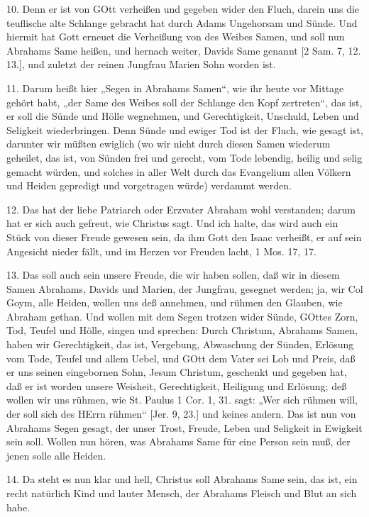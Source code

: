 10. Denn er ist von GOtt verheißen und gegeben wider den Fluch, darein uns die teuflische alte Schlange gebracht hat durch Adams Ungehorsam und Sünde. Und hiermit hat Gott erneuet die Verheißung von des Weibes Samen, und soll nun Abrahams Same heißen, und hernach weiter, Davids Same genannt [2 Sam. 7, 12. 13.], und zuletzt der reinen Jungfrau Marien Sohn worden ist.

11. Darum heißt hier „Segen in Abrahams Samen“, wie ihr heute vor Mittage gehört habt, „der Same des Weibes soll der Schlange den Kopf zertreten“, das ist, er soll die Sünde und Hölle wegnehmen, und Gerechtigkeit, Unschuld, Leben und Seligkeit wiederbringen. Denn Sünde und ewiger Tod ist der Fluch, wie gesagt ist, darunter wir müßten ewiglich (wo wir nicht durch diesen Samen wiederum geheilet, das ist, von Sünden frei und gerecht, vom Tode lebendig, heilig und selig gemacht würden, und solches in aller Welt durch das Evangelium allen Völkern und Heiden gepredigt und vorgetragen würde) verdammt werden.

12. Das hat der liebe Patriarch oder Erzvater Abraham wohl verstanden; darum hat er sich auch gefreut, wie Christus sagt. Und ich halte, das wird auch ein Stück von dieser Freude gewesen sein, da ihm Gott den Isaac verheißt, er auf sein Angesicht nieder fällt, und im Herzen vor Freuden lacht, 1 Mos. 17, 17.

13. Das soll auch sein unsere Freude, die wir haben sollen, daß wir in diesem Samen Abrahams, Davids und Marien, der Jungfrau, gesegnet werden; ja, wir Col Goym, alle Heiden, wollen uns deß annehmen, und rühmen den Glauben, wie Abraham gethan. Und wollen mit dem Segen trotzen wider Sünde, GOttes Zorn, Tod, Teufel und Hölle, singen und sprechen: Durch Christum, Abrahams Samen, haben wir Gerechtigkeit, das ist, Vergebung, Abwaschung der Sünden, Erlösung vom Tode, Teufel und allem Uebel, und GOtt dem Vater sei Lob und Preis, daß er uns seinen eingebornen Sohn, Jesum Christum, geschenkt und gegeben hat, daß er ist worden unsere Weisheit, Gerechtigkeit, Heiligung und Erlösung; deß wollen wir uns rühmen, wie St. Paulus 1 Cor. 1, 31. sagt: „Wer sich rühmen will, der soll sich des HErrn rühmen“ [Jer. 9, 23.] und keines andern. Das ist nun von Abrahams Segen gesagt, der unser Trost, Freude, Leben und Seligkeit in Ewigkeit sein soll. Wollen nun hören, was Abrahams Same für eine Person sein muß, der jenen solle alle Heiden.

14. Da steht es nun klar und hell, Christus soll Abrahams Same sein, das ist, ein recht
natürlich Kind und lauter Mensch, der Abrahams Fleisch und Blut an sich habe.

